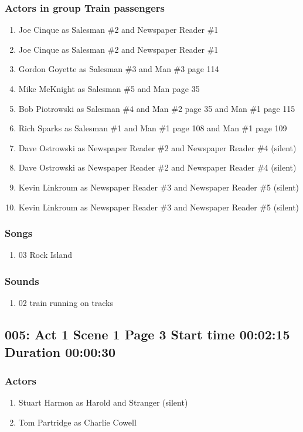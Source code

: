 \subsubsection{Actors in group Train passengers}
\begin{enumerate}
\item Joe Cinque as Salesman \#2 and Newspaper Reader \#1
\item Joe Cinque as Salesman \#2 and Newspaper Reader \#1
\item Gordon Goyette as Salesman \#3 and Man \#3 page 114
\item Mike McKnight as Salesman \#5 and Man page 35
\item Bob Piotrowski as Salesman \#4 and Man \#2 page 35 and Man \#1 page 115
\item Rich Sparks as Salesman \#1 and Man \#1 page 108 and Man \#1 page 109
\item Dave Ostrowski as Newspaper Reader \#2 and Newspaper Reader \#4 (silent)
\item Dave Ostrowski as Newspaper Reader \#2 and Newspaper Reader \#4 (silent)
\item Kevin Linkroum as Newspaper Reader \#3 and Newspaper Reader \#5 (silent)
\item Kevin Linkroum as Newspaper Reader \#3 and Newspaper Reader \#5 (silent)
\end{enumerate}

\subsubsection{Songs}
\begin{enumerate}
\item 03 Rock Island
\end{enumerate}\subsubsection{Sounds}
\begin{enumerate}
\item 02 train running on tracks
\end{enumerate}
\subsection{005: Act 1 Scene 1 Page 3 Start time 00:02:15 Duration 00:00:30}

\subsubsection{Actors}
\begin{enumerate}
\item Stuart Harmon as Harold and Stranger (silent)
\item Tom Partridge as Charlie Cowell
\end{enumerate}
